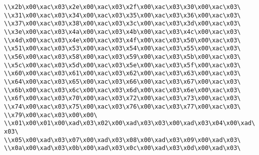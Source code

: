 \verb|\\x2b\x00\xac\x03\x2e\x00\xac\x03\x2f\x00\xac\x03\x30\x00\xac\x03\|\newline
\verb|\\x31\x00\xac\x03\x34\x00\xac\x03\x35\x00\xac\x03\x36\x00\xac\x03\|\newline
\verb|\\x37\x00\xac\x03\x38\x00\xac\x03\x3c\x00\xac\x03\x3d\x00\xac\x03\|\newline
\verb|\\x3e\x00\xac\x03\x4a\x00\xac\x03\x4b\x00\xac\x03\x4c\x00\xac\x03\|\newline
\verb|\\x4d\x00\xac\x03\x4e\x00\xac\x03\x4f\x00\xac\x03\x50\x00\xac\x03\|\newline
\verb|\\x51\x00\xac\x03\x53\x00\xac\x03\x54\x00\xac\x03\x55\x00\xac\x03\|\newline
\verb|\\x56\x00\xac\x03\x58\x00\xac\x03\x59\x00\xac\x03\x5b\x00\xac\x03\|\newline
\verb|\\x5c\x00\xac\x03\x5d\x00\xac\x03\x5e\x00\xac\x03\x5f\x00\xac\x03\|\newline
\verb|\\x60\x00\xac\x03\x61\x00\xac\x03\x62\x00\xac\x03\x63\x00\xac\x03\|\newline
\verb|\\x64\x00\xac\x03\x65\x00\xac\x03\x66\x00\xac\x03\x67\x00\xac\x03\|\newline
\verb|\\x6b\x00\xac\x03\x6c\x00\xac\x03\x6d\x00\xac\x03\x6e\x00\xac\x03\|\newline
\verb|\\x6f\x00\xac\x03\x70\x00\xac\x03\x72\x00\xac\x03\x73\x00\xac\x03\|\newline
\verb|\\x74\x00\xac\x03\x75\x00\xac\x03\x76\x00\xac\x03\x77\x00\xac\x03\|\newline
\verb|\\x79\x00\xac\x03\x00\x00\|\newline
\verb|\\x01\x00\x01\x00\xad\x03\x02\x00\xad\x03\x03\x00\xad\x03\x04\x00\xad\x03\|\newline
\verb|\\x05\x00\xad\x03\x07\x00\xad\x03\x08\x00\xad\x03\x09\x00\xad\x03\|\newline
\verb|\\x0a\x00\xad\x03\x0b\x00\xad\x03\x0c\x00\xad\x03\x0d\x00\xad\x03\|\newline
